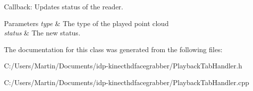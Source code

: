 Callback\+: Updates status of the reader. 


\begin{DoxyParams}{Parameters}
{\em type} & The type of the played point cloud \\
\hline
{\em status} & The new status. \\
\hline
\end{DoxyParams}


The documentation for this class was generated from the following files\+:\begin{DoxyCompactItemize}
\item 
C\+:/\+Users/\+Martin/\+Documents/idp-\/kinecthdfacegrabber/Playback\+Tab\+Handler.\+h\item 
C\+:/\+Users/\+Martin/\+Documents/idp-\/kinecthdfacegrabber/Playback\+Tab\+Handler.\+cpp\end{DoxyCompactItemize}
